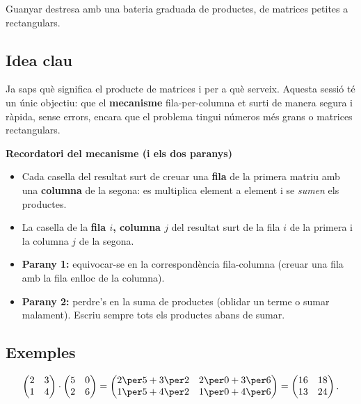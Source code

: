 %
{Guanyar destresa amb una bateria graduada de productes, de matrices petites a rectangulars.}

\subsection{Idea clau}

Ja saps què significa el producte de matrices i per a què serveix. Aquesta sessió
té un únic objectiu: que el \textbf{mecanisme} fila-per-columna et surti de manera
segura i ràpida, sense errors, encara que el problema tingui números més grans o
matrices rectangulars.

\begin{idea}
\textbf{Recordatori del mecanisme (i els dos paranys)}
\begin{itemize}[leftmargin=1.4em, itemsep=2pt]
  \item Cada casella del resultat surt de creuar una \textbf{fila} de la primera
        matriu amb una \textbf{columna} de la segona: es multiplica element a
        element i se \emph{sumen} els productes.
  \item La casella de la \textbf{fila $i$, columna $j$} del resultat surt de la
        fila $i$ de la primera i la columna $j$ de la segona.
  \item \textbf{Parany 1:} equivocar-se en la correspondència fila-columna (creuar
        una fila amb la fila enlloc de la columna).
  \item \textbf{Parany 2:} perdre's en la suma de productes (oblidar un terme o
        sumar malament). Escriu sempre tots els productes abans de sumar.
\end{itemize}
\end{idea}

\subsection{Exemples}

\begin{exemple}
\[
\begin{pmatrix} 2 & 3 \\ 1 & 4 \end{pmatrix}\cdot\begin{pmatrix} 5 & 0 \\ 2 & 6 \end{pmatrix}
=\begin{pmatrix} 2\per 5+3\per 2 & 2\per 0+3\per 6 \\ 1\per 5+4\per 2 & 1\per 0+4\per 6 \end{pmatrix}
=\begin{pmatrix} 16 & 18 \\ 13 & 24 \end{pmatrix}.
\]
\end{exemple}

